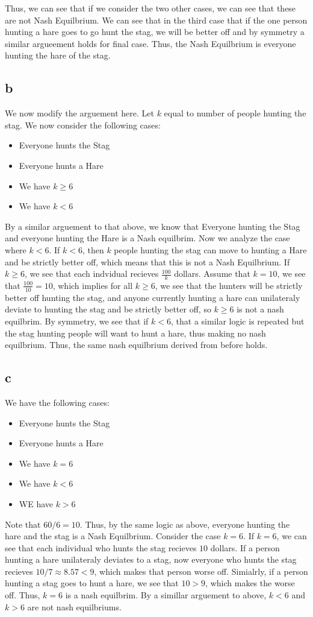 \documentclass[11pt]{article}
\begin{document}
Thus, we can see that if we consider the two other cases, we can see that these are not Nash Equilbrium. We can see that in the third case that if the one person hunting a hare goes to go hunt the stag, we will be better off and by symmetry a similar argueement holds for final case. Thus, the Nash Equilbrium is everyone hunting the hare of the stag.  
\subsection*{b}
We now modify the arguement here. Let $k$ equal to number of people hunting the stag. We now consider the following cases:
\begin{itemize}
    \item Everyone hunts the Stag 
    \item Everyone hunts a Hare 
    \item We have $k \geq 6$
    \item We have $k < 6$
\end{itemize}
By a similar arguement to that above, we know that Everyone hunting the Stag and everyone hunting the Hare is a Nash equilbrim. Now we analyze the case where $k < 6$. If $k < 6$, then $k$ people hunting the stag can move to hunting a Hare and be strictly better off, which means that this is not a Nash Equilbrium. If $k \geq 6$, we see that each indvidual recieves $\frac{100}{k}$ dollars. Assume that $k = 10$, we see that $\frac{100}{10} = 10$, which implies for all $k \geq 6$, we see that the hunters will be strictly better off hunting the stag, and anyone currently hunting a hare can unilateraly deviate to hunting the stag and be strictly better off, so $k \geq 6$ is not a nash equilbrim. By symmetry, we see that if $k < 6$, that a similar logic is repeated but the stag hunting people will want to hunt a hare, thus making no nash equilbrium. Thus, the same nash equilbrium derived from before holds. 
\subsection*{c}
We have the following cases:
\begin{itemize}
    \item Everyone hunts the Stag
    \item Everyone hunts a Hare
    \item We have $k = 6$ 
    \item We have $k < 6$
    \item WE have $k > 6$
\end{itemize}
Note that $60 / 6 = 10$. Thus, by the same logic as above, everyone hunting the hare and the stag is a Nash Equilbrium. Consider the case $k = 6$. If $k = 6$, we can see that each individual who hunts the stag recieves $10$ dollars. If a person hunting a hare unilateraly deviates to a stag, now everyone who hunts the stag recieves $10 /7 \approx 8.57 < 9$, which makes that person worse off. Simialrly, if a person hunting a stag goes to hunt a hare, we see that $10 > 9$, which makes the worse off. Thus, $k = 6$ is a nash equilbrim. By a simillar arguement to above, $k < 6$ and $k > 6$ are not nash equilbriums. 
\end{document}
